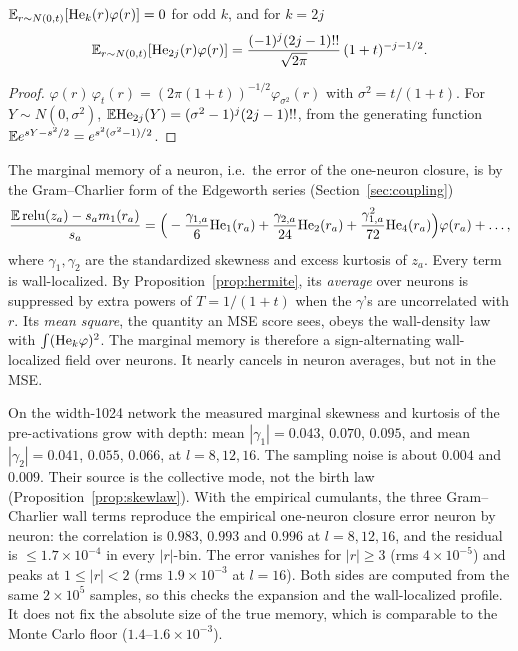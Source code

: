 \begin{proposition}\label{prop:hermite}
$\mathbb E_{r\sim N(0,t)}[\mathrm{He}_k(r)\varphi(r)]=0$ for odd $k$, and for $k=2j$
\[
\mathbb E_{r\sim N(0,t)}[\mathrm{He}_{2j}(r)\varphi(r)]=\frac{(-1)^j(2j-1)!!}{\sqrt{2\pi}}\,(1+t)^{-j-1/2}.
\]
\end{proposition}
\begin{proof}
$\varphi(r)\,\varphi_t(r)=(2\pi(1+t))^{-1/2}\varphi_{\sigma^2}(r)$ with $\sigma^2=t/(1+t)$. For $Y\sim N(0,\sigma^2)$, $\mathbb E\mathrm{He}_{2j}(Y)=(\sigma^2-1)^j(2j-1)!!$, from
the generating function $\mathbb E e^{sY-s^2/2}=e^{s^2(\sigma^2-1)/2}$.
\end{proof}
The marginal memory of a neuron, i.e.\ the error of the one-neuron closure, is by the Gram--Charlier form of the Edgeworth series
(Section~\ref{sec:coupling})
\[
\frac{\mathbb E\operatorname{relu}(z_a)-s_am_1(r_a)}{s_a}=\Big(-\frac{\gamma_{1,a}}6\mathrm{He}_1(r_a)+\frac{\gamma_{2,a}}{24}\mathrm{He}_2(r_a)+\frac{\gamma_{1,a}^2}{72}\mathrm{He}_4(r_a)\Big)\varphi(r_a)+\dots,
\]
where $\gamma_1,\gamma_2$ are the standardized skewness and excess kurtosis of $z_a$. Every term is wall-localized. By
Proposition~\ref{prop:hermite}, its \emph{average} over neurons is suppressed by extra powers of $T=1/(1+t)$ when the $\gamma$'s are
uncorrelated with $r$. Its \emph{mean square}, the quantity an MSE score sees, obeys the wall-density law with $\int(\mathrm{He}_k\varphi)^2$. The
marginal memory is therefore a sign-alternating wall-localized field over neurons. It nearly cancels in neuron averages, but not in
the MSE.

On the width-1024 network the measured marginal skewness and kurtosis of the pre-activations grow with depth: mean $|\gamma_1|=0.043$,
$0.070$, $0.095$, and mean $|\gamma_2|=0.041$, $0.055$, $0.066$, at $l=8,12,16$. The sampling noise is about $0.004$ and $0.009$. Their
source is the collective mode, not the birth law (Proposition~\ref{prop:skewlaw}). With the empirical
cumulants, the three Gram--Charlier wall terms reproduce the empirical one-neuron closure error neuron by neuron: the correlation is
$0.983$, $0.993$ and $0.996$ at $l=8,12,16$, and the residual is $\le1.7\times10^{-4}$ in every $|r|$-bin. The error vanishes for $|r|\ge3$ (rms
$4\times10^{-5}$) and peaks at $1\le|r|<2$ (rms $1.9\times10^{-3}$ at $l=16$). Both sides are computed from the same $2\times10^5$ samples, so
this checks the expansion and the wall-localized profile. It does not fix the absolute size of the true memory, which is comparable to
the Monte Carlo floor ($1.4$--$1.6\times10^{-3}$).
